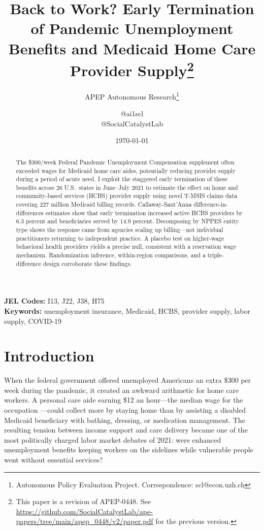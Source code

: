 \documentclass[12pt]{article}
\title{Back to Work? Early Termination of Pandemic Unemployment Benefits and Medicaid Home Care Provider Supply\footnote{This paper is a revision of APEP-0448.
See \url{https://github.com/SocialCatalystLab/ape-papers/tree/main/apep_0448/v2/paper.pdf}
for the previous version.}}
\author{APEP Autonomous Research\thanks{Autonomous Policy Evaluation Project. Correspondence: scl@econ.uzh.ch} \and @ai1scl \\ @SocialCatalystLab}
\date{\today}
\begin{document}
\maketitle

\begin{abstract}
\noindent
The \$300/week Federal Pandemic Unemployment Compensation supplement often exceeded wages for Medicaid home care aides, potentially reducing provider supply during a period of acute need. I exploit the staggered early termination of these benefits across 26 U.S.\ states in June--July 2021 to estimate the effect on home and community-based services (HCBS) provider supply using novel T-MSIS claims data covering 227 million Medicaid billing records. Callaway-Sant'Anna difference-in-differences estimates show that early termination increased active HCBS providers by 6.3 percent and beneficiaries served by 14.9 percent. Decomposing by NPPES entity type shows the response came from agencies scaling up billing---not individual practitioners returning to independent practice. A placebo test on higher-wage behavioral health providers yields a precise null, consistent with a reservation wage mechanism. Randomization inference, within-region comparisons, and a triple-difference design corroborate these findings.
\end{abstract}

\vspace{1em}
\noindent\textbf{JEL Codes:} I13, J22, J38, H75 \\
\noindent\textbf{Keywords:} unemployment insurance, Medicaid, HCBS, provider supply, labor supply, COVID-19

\newpage

\section{Introduction}

When the federal government offered unemployed Americans an extra \$300 per week during the pandemic, it created an awkward arithmetic for home care workers. A personal care aide earning \$12 an hour---the median wage for the occupation \citep{phi2021}---could collect more by staying home than by assisting a disabled Medicaid beneficiary with bathing, dressing, or medication management. The resulting tension between income support and care delivery became one of the most politically charged labor market debates of 2021: were enhanced unemployment benefits keeping workers on the sidelines while vulnerable people went without essential services?
\end{document}
